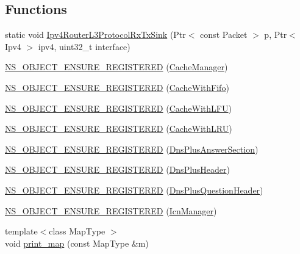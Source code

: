 \subsection*{Functions}
\begin{DoxyCompactItemize}
\item 
static void \hyperlink{namespacens3_acde124208ae741ae241b61b9a22ead8d}{Ipv4\-Router\-L3\-Protocol\-Rx\-Tx\-Sink} (Ptr$<$ const Packet $>$ p, Ptr$<$ Ipv4 $>$ ipv4, uint32\-\_\-t interface)
\item 
\hyperlink{namespacens3_a8da84469566489f34d19639bac5068a9}{N\-S\-\_\-\-O\-B\-J\-E\-C\-T\-\_\-\-E\-N\-S\-U\-R\-E\-\_\-\-R\-E\-G\-I\-S\-T\-E\-R\-E\-D} (\hyperlink{classns3_1_1CacheManager}{Cache\-Manager})
\item 
\hyperlink{namespacens3_aecd9f25af1b30fe642f6ecdfc1eac7fd}{N\-S\-\_\-\-O\-B\-J\-E\-C\-T\-\_\-\-E\-N\-S\-U\-R\-E\-\_\-\-R\-E\-G\-I\-S\-T\-E\-R\-E\-D} (\hyperlink{classns3_1_1CacheWithFifo}{Cache\-With\-Fifo})
\item 
\hyperlink{namespacens3_a704818cf1d1907da8696fd1ba465ec38}{N\-S\-\_\-\-O\-B\-J\-E\-C\-T\-\_\-\-E\-N\-S\-U\-R\-E\-\_\-\-R\-E\-G\-I\-S\-T\-E\-R\-E\-D} (\hyperlink{classns3_1_1CacheWithLFU}{Cache\-With\-L\-F\-U})
\item 
\hyperlink{namespacens3_a35f0a7af48a81b53a1ef5dc824e13802}{N\-S\-\_\-\-O\-B\-J\-E\-C\-T\-\_\-\-E\-N\-S\-U\-R\-E\-\_\-\-R\-E\-G\-I\-S\-T\-E\-R\-E\-D} (\hyperlink{classns3_1_1CacheWithLRU}{Cache\-With\-L\-R\-U})
\item 
\hyperlink{namespacens3_a3e3a498ea22985f2c7e32c84a98efe01}{N\-S\-\_\-\-O\-B\-J\-E\-C\-T\-\_\-\-E\-N\-S\-U\-R\-E\-\_\-\-R\-E\-G\-I\-S\-T\-E\-R\-E\-D} (\hyperlink{classns3_1_1DnsPlusAnswerSection}{Dns\-Plus\-Answer\-Section})
\item 
\hyperlink{namespacens3_a57376580499e06ddc7511faa940ee830}{N\-S\-\_\-\-O\-B\-J\-E\-C\-T\-\_\-\-E\-N\-S\-U\-R\-E\-\_\-\-R\-E\-G\-I\-S\-T\-E\-R\-E\-D} (\hyperlink{classns3_1_1DnsPlusHeader}{Dns\-Plus\-Header})
\item 
\hyperlink{namespacens3_a80d7142232aff7f2dc93bc1712e44175}{N\-S\-\_\-\-O\-B\-J\-E\-C\-T\-\_\-\-E\-N\-S\-U\-R\-E\-\_\-\-R\-E\-G\-I\-S\-T\-E\-R\-E\-D} (\hyperlink{classns3_1_1DnsPlusQuestionHeader}{Dns\-Plus\-Question\-Header})
\item 
\hyperlink{namespacens3_aeee9902c9606817f94af20038a756d49}{N\-S\-\_\-\-O\-B\-J\-E\-C\-T\-\_\-\-E\-N\-S\-U\-R\-E\-\_\-\-R\-E\-G\-I\-S\-T\-E\-R\-E\-D} (\hyperlink{classns3_1_1IcnManager}{Icn\-Manager})
\item 
{\footnotesize template$<$class Map\-Type $>$ }\\void \hyperlink{namespacens3_ab673fe087092e83ec770c736b6cb6c3f}{print\-\_\-map} (const Map\-Type \&m)

\end{DoxyCompactItemize}
